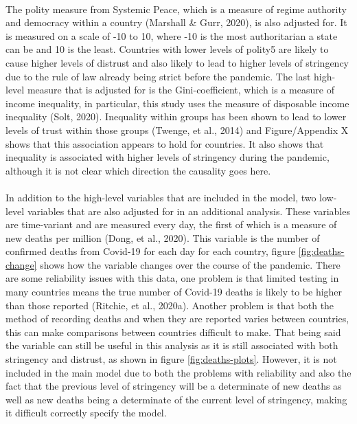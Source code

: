 \documentclass[
  11pt,
]{article}
\begin{document}
~\\
The polity measure from Systemic Peace, which is a measure of regime authority and democracy within a country (Marshall \& Gurr, 2020), is also adjusted for. It is measured on a scale of -10 to 10, where -10 is the most authoritarian a state can be and 10 is the least. Countries with lower levels of polity5 are likely to cause higher levels of distrust and also likely to lead to higher levels of stringency due to the rule of law already being strict before the pandemic. The last high-level measure that is adjusted for is the Gini-coefficient, which is a measure of income inequality, in particular, this study uses the measure of disposable income inequality (Solt, 2020). Inequality within groups has been shown to lead to lower levels of trust within those groups (Twenge, et al., 2014) and Figure/Appendix X shows that this association appears to hold for countries. It also shows that inequality is associated with higher levels of stringency during the pandemic, although it is not clear which direction the causality goes here.\\
~\\
In addition to the high-level variables that are included in the model, two low-level variables that are also adjusted for in an additional analysis. These variables are time-variant and are measured every day, the first of which is a measure of new deaths per million (Dong, et al., 2020). This variable is the number of confirmed deaths from Covid-19 for each day for each country, figure \ref{fig:deaths-change} shows how the variable changes over the course of the pandemic. There are some reliability issues with this data, one problem is that limited testing in many countries means the true number of Covid-19 deaths is likely to be higher than those reported (Ritchie, et al., 2020a). Another problem is that both the method of recording deaths and when they are reported varies between countries, this can make comparisons between countries difficult to make. That being said the variable can still be useful in this analysis as it is still associated with both stringency and distrust, as shown in figure \ref{fig:deaths-plots}. However, it is not included in the main model due to both the problems with reliability and also the fact that the previous level of stringency will be a determinate of new deaths as well as new deaths being a determinate of the current level of stringency, making it difficult correctly specify the model.\\
~\\
\end{document}
